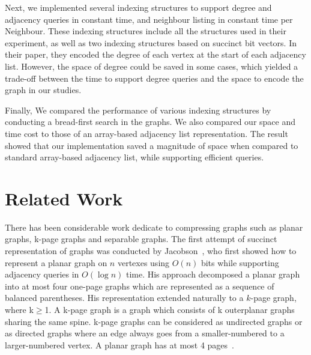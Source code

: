\documentclass[12pt,glossary]{dalthesis}
\begin{document}
\bigskip
\bigskip

Next, we implemented several indexing structures to support degree and adjacency queries in constant time, and neighbour listing in constant time per Neighbour. These indexing structures include all the structures used in their experiment, as well as two indexing structures based on succinct bit vectors. In their paper, they encoded the degree of each vertex at the start of each adjacency list. However, the space of degree could be saved in some cases, which yielded a trade-off between the time to support degree queries and the space to encode the graph in our studies.

\bigskip
\bigskip

Finally, We compared the performance of various indexing structures by conducting a bread-first search in the graphs. We also compared our space and time cost to those of an array-based adjacency list representation. The result showed that our implementation saved a magnitude of space when compared to standard array-based adjacency list, while supporting efficient queries.   

\section{Related Work}

There has been considerable work dedicate to compressing graphs such as planar graphs, k-page graphs and separable graphs. The first attempt of succinct representation of graphs was conducted by Jacobson~\cite{Jacobson}, who first showed how to represent a planar graph on $n$ vertexes using $O(n)$ bits while supporting adjacency queries in $O(\log n)$ time. His approach decomposed a planar graph into at most four one-page graphs which are represented as a sequence of balanced parentheses. His representation extended naturally to a $k$-page graph, where k$\geq$1. A k-page graph is a graph which consists of k outerplanar graphs sharing the same spine. k-page graphs can be considered as undirected graphs or as directed graphs where an edge always goes from a smaller-numbered to a larger-numbered vertex. A planar graph has at most 4 pages~\cite{k-page-def}. 

\bigskip
\bigskip
\end{document}
